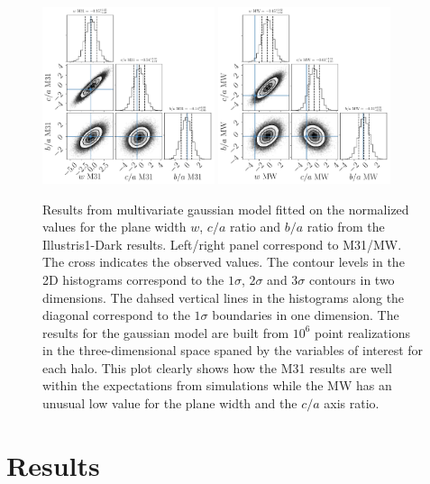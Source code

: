 \documentclass[a4paper,fleqn,usenatbib]{mnras}
\begin{document}
\begin{figure}
\centering
\includegraphics[width=0.45\textwidth]{gaussian_model_illustrisdm_M31.pdf}
\includegraphics[width=0.45\textwidth]{gaussian_model_illustrisdm_MW.pdf}
\caption{Results from multivariate gaussian model fitted on   the
  normalized values for the plane width $w$, $c/a$ ratio and $b/a$
  ratio from the Illustris1-Dark results.  
  Left/right panel correspond
  to M31/MW.  
  The cross indicates the observed values.
  The contour levels in the 2D histograms correspond to the $1\sigma$,
$2\sigma$ and $3\sigma$ contours in two dimensions.
  The dahsed vertical lines in the histograms along the diagonal
  correspond to the $1\sigma$ boundaries in one dimension.
  The results for the gaussian model are built from $10^6$ point
  realizations in the three-dimensional space spaned by the variables of
  interest for each halo. 
  This plot clearly shows how the M31 results are well within the
  expectations from simulations while the MW has an unusual low value for
  the plane width and the $c/a$ axis ratio.
\label{fig:correlations_illustrisdm}}
\end{figure}


\section{Results}
\label{sec:results}
\end{document}
